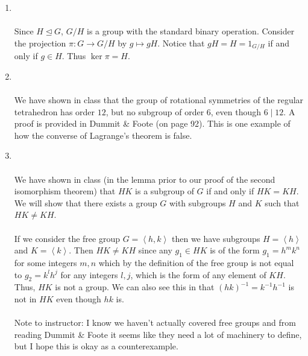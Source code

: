 \documentclass[12 pt, letterpaper]{hmcpset}
\begin{document}
\begin{solution}
\begin{enumerate}
		\item {} \\\\
			Since $H \trianglelefteq G$, $G/H$ is a group with the standard binary operation. Consider the projection $\pi : G \to G/H$ by $g \mapsto gH$. Notice that $gH = H = 1_{G/H}$ if and only if $g \in H$. Thus $\ker \pi = H$.
		\item {} \\\\
			We have shown in class that the group of rotational symmetries of the regular tetrahedron has order $12$, but no subgroup of order $6$, even though $6 \mid 12$. A proof is provided in Dummit \& Foote (on page 92). This is one example of how the converse of Lagrange's theorem is false.
		\item {} \\\\
			We have shown in class (in the lemma prior to our proof of the second isomorphism theorem) that $HK$ is a subgroup of $G$ if and only if $HK = KH$. We will show that there exists a group $G$ with subgroups $H$ and $K$ such that $HK \neq KH$. \\\\
			If we consider the free group $G = \left < h, k \right >$ then we have subgroups $H = \left < h \right >$ and $K = \left < k \right >$. Then $HK \neq KH$ since any $g_{1} \in HK$ is of the form $g_{1} = h^{m} k^{n}$ for some integers $m, n$ which by the definition of the free group is not equal to $g_{2} = k^{l} h^{j}$ for any integers $l, j$, which is the form of any element of $KH$. Thus, $HK$ is not a group. We can also see this in that $(hk)^{-1} = k^{-1}h^{-1}$ is not in $HK$ even though $hk$ is. \\\\
			Note to instructor: I know we haven't actually covered free groups and from reading Dummit \& Foote it seems like they need a lot of machinery to define, but I hope this is okay as a counterexample.
	\end{enumerate}
\end{solution}
\end{document}
